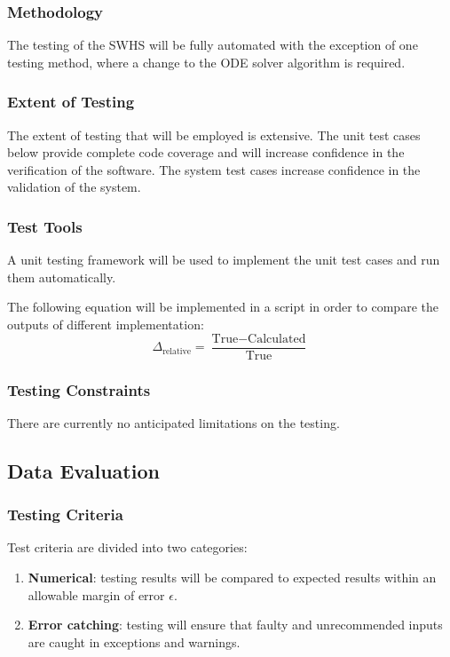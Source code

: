 \documentclass[12pt]{article}
\begin{document}
\subsubsection{Methodology} 
The testing of the SWHS will be fully automated with the exception of one testing 
method, where a change to the ODE solver algorithm is required.

\subsubsection{Extent of Testing}
The extent of testing that will be employed is extensive. The unit test
 cases below provide complete code coverage and will increase confidence in the
  verification of the software. The system test cases increase confidence in the 
  validation of the system.

\subsubsection{Test Tools}
A unit testing framework will be used to implement the unit test cases and run them automatically.

The following equation will be implemented in a script in order to compare the outputs of different implementation:
$$\Delta_{\text{relative}} = \frac{\text{True} - \text{Calculated}}
 {\text{True}} $$

\subsubsection{ Testing Constraints}
There are currently no anticipated limitations on the testing.

\subsection{ Data Evaluation}

\subsubsection{ Testing Criteria}
Test criteria are divided into two categories:
\begin{enumerate}
\item \textbf{Numerical}: testing results will be compared to expected results within an allowable margin of error $\epsilon$.

\item \textbf{Error catching}: testing will ensure that faulty and unrecommended
 inputs are caught in exceptions and warnings. 
\end{enumerate}
\end{document}
